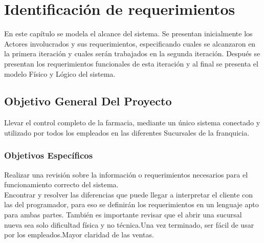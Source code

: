 \chapter{Identificación de requerimientos}
\label{cap:reqUsr}

	En este capítulo se modela el alcance del sistema. Se presentan inicialmente los Actores involucrados y sus requerimientos, especificando cuales se alcanzaron en la primera iteración y cuales serán trabajados en la segunda iteración. Después se presentan los requerimientos funcionales de esta iteración y al final se presenta el modelo Físico y Lógico del sistema.

\section{Objetivo General Del Proyecto}
Llevar  el  control  completo  de  la  farmacia,  mediante  un   único  sistema  conectado  y utilizado por todos los empleados en las diferentes Sucursales de la franquicia.
\subsection{Objetivos Específicos}
Realizar una revisión sobre la información o requerimientos necesarios para el funcionamiento correcto del sistema.\\
Encontrar y resolver las diferencias que puede llegar a interpretar el cliente con las del programador, para eso se definirán los requerimientos en un lenguaje apto para ambas partes.
También es importante revisar que el abrir una sucursal nueva sea solo dificultad física y no técnica.Una vez terminado, ser fácil de usar por los empleados.Mayor claridad de las ventas.


